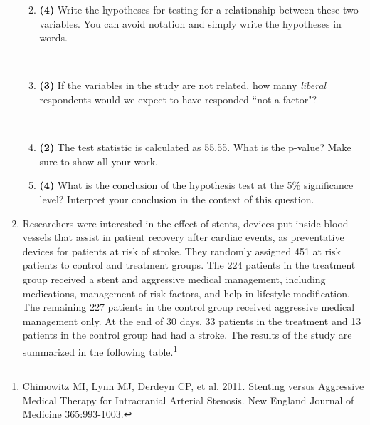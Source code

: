 \documentclass[11pt]{article}
\newcommand{\soln}[1]{ \vspace{1.35cm} }
\newcommand{\pts}[1]{ \textbf{{\footnotesize \textcolor{black}{(#1)}}} }	%
\begin{document}
\begin{enumerate}
\begin{enumerate}
\soln{Chi-squared test of independence.}

\item \pts{4} Write the hypotheses for testing for a relationship between these two variables. You can avoid notation and simply write the hypotheses in words.

\soln{$H_0$: Political ideology and the degree to which Florida residents think the victim's race was a major factor in this shooting are independent of each other. \\
$H_A$: Political ideology and the degree to which Florida residents think the victim's race was a major factor in this shooting are associated.
}
$\:$

\item \pts{3} If the variables in the study are not related, how many \emph{liberal} respondents would we expect to have responded ``not a factor"?

\soln{\[ E_{\text{not a factor, liberal}} = \frac{124 \times 155}{738} = 26.04 \approx 26 \]}
$\:$

\item \pts{2} The test statistic is calculated as 55.55. What is the p-value? Make sure to show all your work.

\soln{$df = (R - 1) \times (C - 1) = 3 \times 2 = 6$, p-value is less than 0.001.}

\item \pts{4} What is the conclusion of the hypothesis test at the 5\% significance level? Interpret your conclusion in the context of this question.

\soln{Reject $H_0$. The data provide convincing evidence that the political ideology and the degree to which Florida residents think the victim's race was a major factor in this shooting are associated.}

\end{enumerate}

%

\pagebreak

\item Researchers were interested in the effect of stents, devices put inside blood vessels that assist in patient recovery after cardiac events, as preventative devices for patients at risk of stroke. They randomly assigned 451 at risk patients to control and treatment groups. The 224 patients in the treatment group received a stent and aggressive medical management, including medications, management of risk factors, and help in lifestyle modification. The remaining 227 patients in the control group received aggressive medical management only. At the end of 30 days, 33 patients in the treatment and 13 patients in the control group had had a stroke. The results of the study are summarized in the following table.\footnote{Chimowitz MI, Lynn MJ, Derdeyn CP, et al. 2011. Stenting versus Aggressive Medical Therapy for Intracranial Arterial Stenosis. New England Journal of Medicine 365:993-1003.} \\


\end{enumerate}
\end{document}
